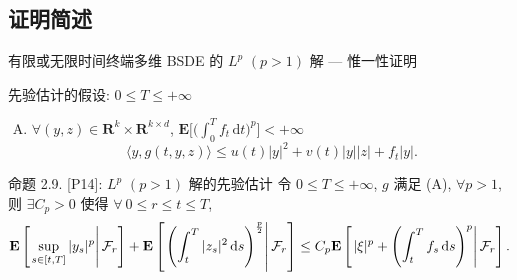 \documentclass[xcolor=svgnames,serif,table,10pt]{beamer}
\newcommand{\rtn}{\mathrm{\mathbf{R}}}
\newcommand*{\EX}{\mathrm{\mathbf{E}}}
\newcommand*{\dif}{\,\mathrm{d}}
\newcommand*{\F}{\mathcal{F}}
\newcommand{\tT}[1][0]{[#1,T]}
\newcommand{\intT}[2][T]{\int^{#1}_{#2}}
\begin{document}
\subsection{证明简述}

\begin{frame}{有限或无限时间终端多维 BSDE 的 $L^p$ $(p>1)$ 解 --- 惟一性证明}
\vspace{-2ex}
  \begin{block}{先验估计的假设: $0\leq T\leq+\infty$}
    \begin{enumerate}[(A)]
      \item $\forall(y,z)\in\rtn^k\times\rtn^{k\times d}$, $\EX\big[\big(\intT{0}f_t\dif t\big)^p\big]<+\infty$
            \[
              \langle y,g(t,y,z)\rangle\leq u(t)|y|^2+v(t)|y||z|+f_t|y|.
            \]
    \end{enumerate}
  \end{block}

  \begin{exampleblock}{命题 2.9. [P14]: $L^p$ $(p>1)$ 解的先验估计}
    \qquad 令 $0\leq T\leq+\infty$, $g$ 满足 (A), $\forall p>1$,
    则 $\exists C_p>0$ 使得 $\forall\ 0\leq r\leq t\leq T$,
    \begin{align*}
     \EX
       \left[\left.
         \sup_{s\in\tT[t]}|y_s|^p\right|\F_r
       \right]+
       \EX
       \left[\left.
        \left(
          \intT{t}|z_s|^2\dif s
        \right)^{p\over 2}\right|\F_r
       \right]
     \leq C_p\EX
        \left[\left.|\xi|^p+
          \left(
            \intT{t}f_s\dif s
          \right)^p\right|\F_r
        \right].
    \end{align*}
  \end{exampleblock}
\end{frame}
\end{document}
